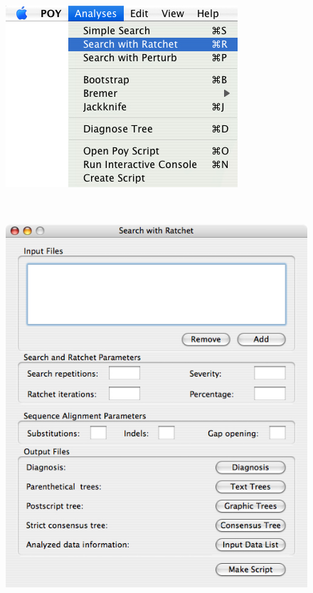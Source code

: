 {\begin{figure}
\centering
\begin{minipage}[c]{0.45\textwidth}
   		\includegraphics[width=\textwidth]{doc/figures/searchwithratchet_menu.jpg}
\end{minipage}
\,
\begin{minipage}[c]{0.52\textwidth}
	   	\includegraphics[width=\textwidth]{doc/figures/searchwithratchet_window.jpg}
   	\end{minipage}
	

\end{figure}}
